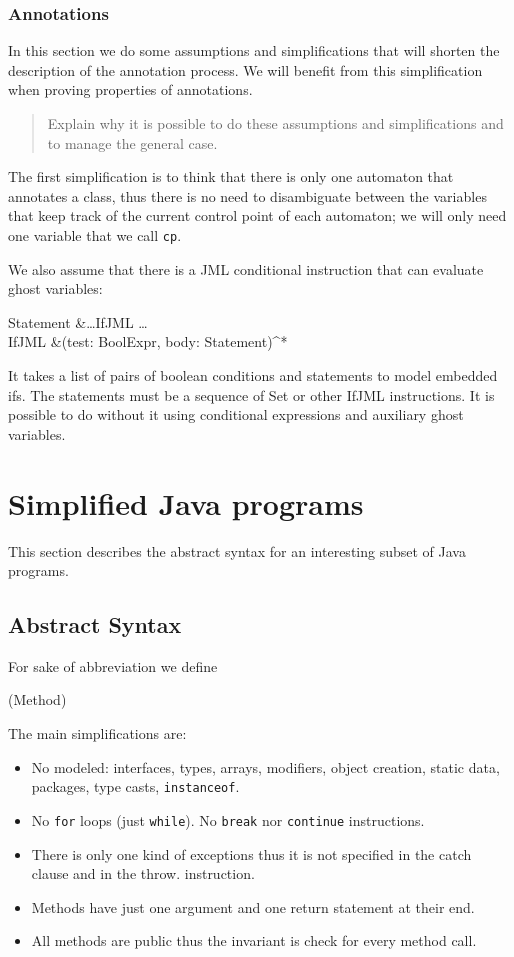 \documentclass[a4paper,10pt]{article}
\begin{document}
\subsubsection*{Annotations}
In this section we do some assumptions and simplifications that will shorten the description of the
annotation process.
We will benefit from this simplification when proving properties of annotations.

\begin{quote}
\small
Explain why it is possible to do these assumptions and simplifications and to manage the general case.
\end{quote}

The first simplification is to think that there is only one automaton that annotates a class, thus there is
no need to disambiguate between the variables that keep track of the current control point of each automaton;
we will only need one variable that we call \texttt{cp}.

We also assume that there is a JML conditional instruction that can evaluate ghost variables:
\begin{haskell}
Statement &\geqdef \ldots \gbar IfJML \gbar \ldots\\
IfJML &\geqdef (test: BoolExpr, body: Statement)^*
\end{haskell}

It takes a list of pairs of boolean conditions and statements to model embedded ifs. The statements must
be a sequence of \<Set\> or other \<IfJML\> instructions.
It is possible to do without it using conditional expressions and auxiliary ghost variables.


\section{Simplified Java programs}\label{sec:JavaProgs}
This section describes the abstract syntax for an interesting subset of Java programs.

\subsection{Abstract Syntax}
For sake of abbreviation we define
\begin{haskell}
\Methods \eqdef \powerset(Method)
\end{haskell}

The main simplifications are:
\begin{itemize}
  \item No modeled: interfaces, types, arrays, modifiers, object creation, static data, packages, type casts,
\texttt{instanceof}.
  \item No \texttt{for} loops (just \texttt{while}). No \texttt{break} nor \texttt{continue} instructions.
  \item There is only one kind of exceptions thus it is not specified in the catch clause and in the throw.
instruction.
  \item Methods have just one argument and one return statement at their end.
  \item All methods are public thus the invariant is check for every method call.
\end{itemize}
\end{document}
